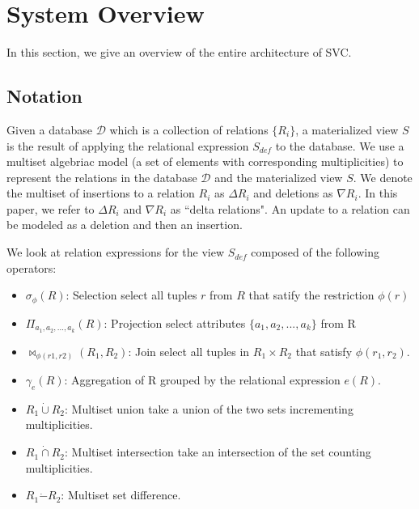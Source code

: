 \section{System Overview}\label{sec-arch}
In this section, we give an overview of the entire architecture of SVC.
\vspace{-.5em}
\subsection{Notation}
Given a database $\mathcal{D}$ which is a collection of relations $\{R_i\}$, a materialized view $S$ is the result of applying the relational expression $S_{def}$ to the database.
We use a multiset algebriac model (a set of elements with corresponding multiplicities) to represent the relations in the database $\mathcal{D}$ and the materialized view $S$.
We denote the multiset of insertions to a relation $R_i$ as $\Delta R_i$ and deletions as $\nabla R_i$.
In this paper, we refer to $\Delta R_i$ and $\nabla R_i$ as ``delta relations".
An update to a relation can be modeled as a deletion and then an insertion.

We look at relation expressions for the view $S_{def}$ composed of the following operators:
\begin{itemize}\vspace{-.45em}
\item $\sigma_{\phi}(R)$: Selection select all tuples $r$ from $R$ that satify the restriction $\phi (r)$ \vspace{-.45em}
\item $\Pi_{a_1,a_2,...,a_k}(R)$: Projection select attributes $\{a_1,a_2,...,a_k\}$ from R \vspace{-.45em}
\item $\bowtie_{\phi (r1,r2)}(R_1,R_2)$: Join select all tuples in $R_1 \times R_2$ that satisfy $\phi (r_1,r_2)$.
\item $\gamma_{e}(R)$: Aggregation of R grouped by the relational expression $e(R)$.\vspace{-.45em}
\item $R_1 \dot{\cup} R_2$: Multiset union take a union of the two sets incrementing multiplicities.
\item $R_1 \dot{\cap} R_2$: Multiset intersection take an intersection of the set counting multiplicities.
\item $R_1 \dot{-} R_2$: Multiset set difference.
\end{itemize}

